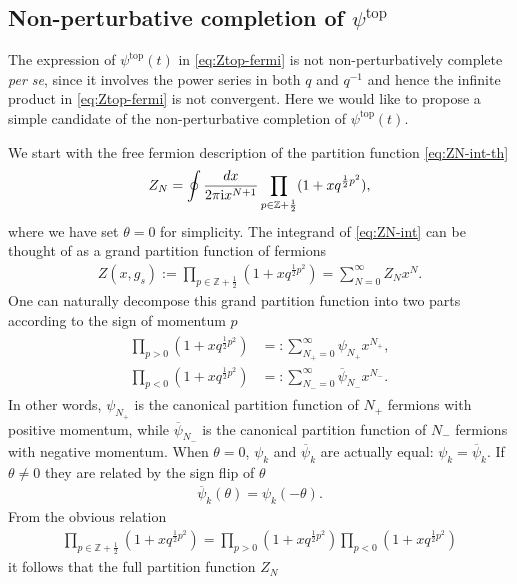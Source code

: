\documentclass[11pt]{article}
\newcommand{\ri}{{\rm i}}
\def\th{\theta}
\newcommand{\hf}{\frac{1}{2}}
\def\b#1{\overline{#1}}
\renewcommand{\[}{\begin{eqnarray}}
\renewcommand{\]}{\end{eqnarray}}
\begin{document}
\subsection{Non-perturbative completion of $\psi^{\text{top}}$}

The expression of $\psi^{\text{top}}(t)$ in \eqref{eq:Ztop-fermi}
is not  non-perturbatively complete {\it per se}, since it involves
the power series in both $q$ and $q^{-1}$
and hence the infinite product
in \eqref{eq:Ztop-fermi} is not convergent.
Here we would like to propose a simple candidate
of the non-perturbative completion of $\psi^{\text{top}}(t)$.

We start with the free fermion description of
the partition function \eqref{eq:ZN-int-th}
\begin{align}
 Z_N=\oint\frac{dx}{2\pi\ri x^{N+1}}
\prod_{p\in\mathbb{Z}+\hf}(1+xq^{\hf p^2}),
\label{eq:ZN-int}
\end{align}
where we have set $\theta=0$ for simplicity.
The integrand of \eqref{eq:ZN-int}
can be thought of as a grand partition function of fermions
\begin{align}
 Z(x,g_s):=\prod_{p\in\mathbb{Z}+\frac{1}{2}}(1+xq^{\hf p^2})=\sum_{N=0}^\infty Z_Nx^N.
\label{eq:grandZ}
\end{align} 
One can naturally decompose this grand partition function
into two parts according to the sign of momentum $p$
\begin{align}
\begin{aligned}
 \prod_{p>0}(1+xq^{\hf p^2})&=:\sum_{N_+=0}^\infty \psi_{N_+}x^{N_+},\\
\prod_{p<0}(1+xq^{\hf p^2})&=:\sum_{N_-=0}^\infty \b{\psi}_{N_-}x^{N_-}.
\end{aligned}
\label{eq:psi-gen-func}
\end{align}
In other words, $\psi_{N_+}$ is the canonical partition function of $N_+$ fermions with
positive momentum, while 
$\b{\psi}_{N_-}$ is the canonical partition function of $N_-$ fermions with
negative momentum.
When $\th=0$, $\psi_{k}$ and $\b{\psi}_{k}$ are actually equal: $\psi_{k}=\b{\psi}_{k}$.
If $\th\ne0$ they are related by the sign flip of $\th$
\begin{align}
 \b{\psi}_{k}(\th)=\psi_{k}(-\th).
\end{align}
From the obvious relation
\begin{align}
 \prod_{p\in\mathbb{Z}+\frac{1}{2}}(1+xq^{\hf p^2})=\prod_{p>0}(1+xq^{\hf p^2})
\prod_{p<0}(1+xq^{\hf p^2})
\end{align}
it follows that the full partition function $Z_N$
\end{document}
